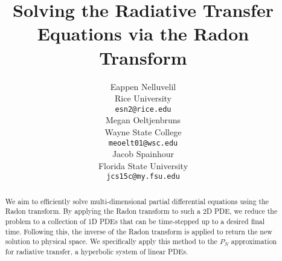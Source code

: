 \documentclass{article}
\title{Solving the Radiative Transfer Equations via the Radon Transform}
\author{%
  Eappen Nelluvelil \\
  Rice University \\
  \texttt{esn2@rice.edu} \\
  \And
  Megan Oeltjenbruns \\
  Wayne State College \\
  \texttt{meoelt01@wsc.edu} \\
  \And
  Jacob Spainhour \\
  Florida State University \\
  \texttt{jcs15c@my.fsu.edu} \\
}
\begin{document}
\maketitle

\begin{abstract}

We aim to efficiently solve multi-dimensional partial differential equations using the Radon transform. By applying the Radon transform to such a 2D PDE, we reduce the problem to a collection of 1D PDEs that can be time-stepped up to a desired final time. Following this, the inverse of the Radon transform is applied to return the new solution to physical space. We specifically apply this method to the $P_N$ approximation for radiative transfer, a hyperbolic system of linear PDEs.

\end{abstract}












\end{document}
